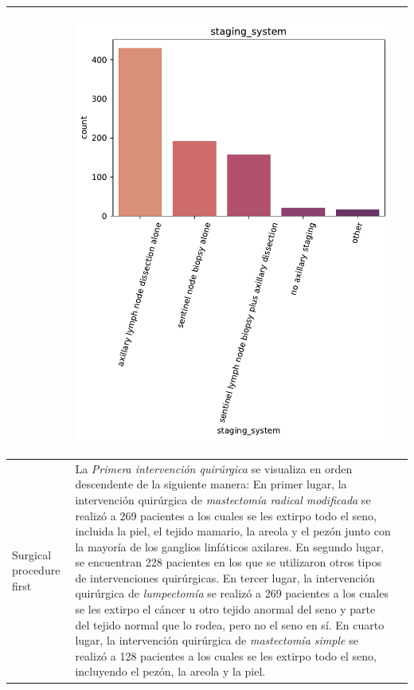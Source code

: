 \begin{table}[!htb]
\begin{threeparttable}
\begin{tabular}{p{2.5cm} p{7cm} p{6.5cm}}
			& \begin{center}\includegraphics[width=1\linewidth]{NOTEBOOK/IMAGENES_DESCRIPTIVAS/40_staging_system}\end{center}
			\\ \hline
			
			Surgical procedure first
			& La \textit{Primera intervención quirúrgica} se visualiza en orden descendente de la siguiente manera: En primer lugar, la intervención quirúrgica de \textit{mastectomía radical modificada} se realizó a 269 pacientes a los cuales se les extirpo todo el seno, incluida la piel, el tejido mamario, la areola y el pezón junto con la mayoría de los ganglios linfáticos axilares. En segundo lugar, se encuentran 228 pacientes en los que se utilizaron otros tipos de intervenciones quirúrgicas. En tercer lugar, la intervención quirúrgica de \textit{lumpectomía} se realizó a 269 pacientes a los cuales se les extirpo el cáncer u otro tejido anormal del seno y parte del tejido normal que lo rodea, pero no el seno en sí. En cuarto lugar, la intervención quirúrgica de \textit{mastectomía simple} se realizó a 128 pacientes a los cuales se les extirpo todo el seno, incluyendo el pezón, la areola y la piel.
			

\end{tabular}
\end{threeparttable}
\end{table}

